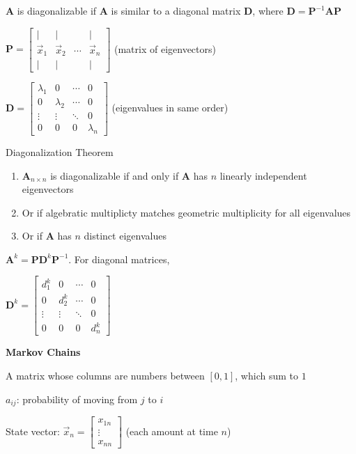 \documentclass[10pt]{article}
\newcommand{\matr}[1]{\mathbf{#1}}
\newcommand{\inv}{^{-1}}
\newcommand\heading[1]{\medskip\textbf{#1}\medskip}
\begin{document}
\begin{multicols*}{3}
$\matr{A}$ is diagonalizable if $\matr{A}$ is similar to a diagonal matrix $\matr{D}$, where $\matr{D}=\matr{P}\inv\matr{A}\matr{P}$

$\matr{P}=\begin{bmatrix}
    \vert & \vert & & \vert \\
    \vec x_1 & \vec x_2 & \cdots & \vec x_n \\
    \vert & \vert & & \vert 
\end{bmatrix}$ (matrix of eigenvectors)

$\matr{D}=\begin{bmatrix}
    \lambda_1 & 0 & \cdots & 0 \\
    0 & \lambda_2 & \cdots & 0 \\
    \vdots & \vdots & \ddots & 0 \\
    0 & 0 & 0 & \lambda_n
\end{bmatrix}$ (eigenvalues in same order)

Diagonalization Theorem 

\begin{enumerate}[noitemsep,topsep=0pt]
    \item $\matr{A}_{n\times n}$ is diagonalizable if and only if $\matr{A}$ has $n$ linearly independent eigenvectors 
    \item Or if algebratic multiplicty matches geometric multiplicity for all eigenvalues 
    \item Or if $\matr{A}$ has $n$ distinct eigenvalues
\end{enumerate}

$\matr{A}^k=\matr{P}\matr{D}^k\matr{P}\inv$. For diagonal matrices,

$\matr{D}^k=\begin{bmatrix}
    d_1^k & 0 & \cdots & 0 \\
    0 & d_2^k & \cdots & 0 \\
    \vdots & \vdots & \ddots & 0 \\
    0 & 0 & 0 & d_n^k
\end{bmatrix}$

\heading{Markov Chains}

A matrix whose columns are numbers between $[0,1]$, which sum to $1$ 

$a_{ij}$: probability of moving from $j$ to $i$

State vector: $\vec x_n=\begin{bmatrix}
    x_{1n} \\
    \vdots \\
    x_{nn}
\end{bmatrix}$ (each amount at time $n$)


\end{multicols*}
\end{document}
